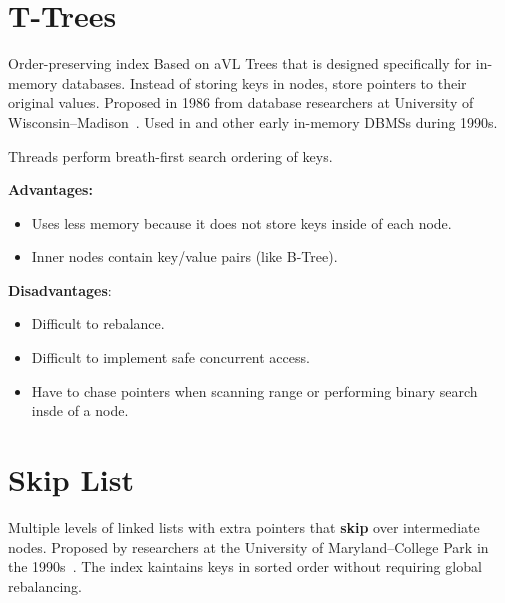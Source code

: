 \documentclass[11pt]{article}
\begin{document}
\maketitle
\thispagestyle{plain}

\section{T-Trees}
Order-preserving index Based on aVL Trees that is designed specifically for in-memory databases. 
Instead of storing keys in nodes, store pointers to their original 
values. Proposed in 1986 from database researchers at University of Wisconsin--Madison~\cite{P294}.
Used in  and other early in-memory DBMSs during 1990s.

Threads perform breath-first search ordering of keys.

\textbf{Advantages:}
\begin{itemize}
    \item
    Uses less memory because it does not store keys inside of each node.
    
    \item
    Inner nodes contain key/value pairs (like B-Tree).
\end{itemize}

\textbf{Disadvantages}:
\begin{itemize}
    \item
    Difficult to rebalance.
    
    \item
    Difficult to implement safe concurrent access.
    
    \item
    Have to chase pointers when scanning range or performing binary search insde of a node.
\end{itemize}

\section{Skip List}
Multiple levels of linked lists with extra pointers that \textbf{skip} over intermediate nodes. 
Proposed by researchers at the University of Maryland--College Park in the 1990s~\cite{p668-pugh}.
The index kaintains keys in sorted order without requiring global rebalancing.
\end{document}
